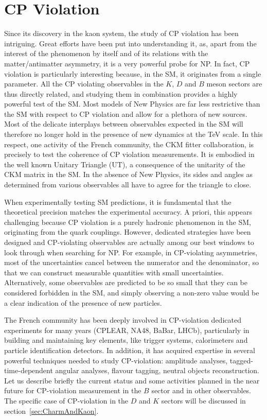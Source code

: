 

\section{CP Violation}
\label{sec:cpv}
Since its discovery in the kaon system, the study of CP violation has been intriguing. Great efforts have been put into understanding it, as,  apart from the interest of the phenomenon by itself and of its relations with the matter/antimatter asymmetry, it is a very powerful probe for NP.  In fact,  CP violation is particularly interesting because, in the SM, it originates from a single parameter. All the CP violating observables in the $K$, $D$ and $B$ meson sectors are thus directly related, and studying them in combination provides a highly powerful test of the SM.
Most models of New Physics are far less restrictive than the SM with respect to CP violation and allow for a
plethora of new sources. 
Most of the delicate interplays between observables
expected in the SM will therefore no longer hold in the presence of new dynamics at the TeV scale.
In this respect, one
activity of the French community, the CKM fitter collaboration, is precisely
to test the coherence of CP violation measurements. It is embodied in the well
known Unitary Triangle (UT), a consequence of the unitarity of the CKM matrix
in the SM. In the absence of New Physics, its sides and angles as determined
from various observables all have to agree for the triangle to close.


When experimentally testing SM predictions, it is fundamental that the
theoretical precision matches the experimental accuracy. A priori, this appears
challenging because CP violation is a purely hadronic phenomenon in the SM,
originating from the quark couplings. However, dedicated strategies have been
designed and CP-violating observables are actually among our best windows to look through when searching for  NP. For
example, in CP-violating asymmetries, most of the uncertainties cancel between
the numerator and the denominator, so that we can construct measurable
quantities with small uncertainties. Alternatively, some observables are
predicted to be so small that they can be considered forbidden in the SM, and
simply observing a non-zero value would be a clear indication of the presence of new particles.

The French community has been deeply involved in CP-violation dedicated experiments for
many years (CPLEAR, NA48, BaBar, LHCb), particularly in building and maintaining key
elements, like trigger systems, calorimeters and particle identification detectors. In addition, it has acquired expertise in several powerful techniques needed to study CP-violation: amplitude analyses, tagged-time-dependent
angular analyses, flavour tagging, neutral objects reconstruction.  Let us describe
briefly the current status and some activities planned in the near future for CP-violation measurement in the $B$ sector and in other observables. The specific case of CP-violation in the $D$ and $K$ sectors will be discussed in section~\ref{sec:CharmAndKaon}. 

